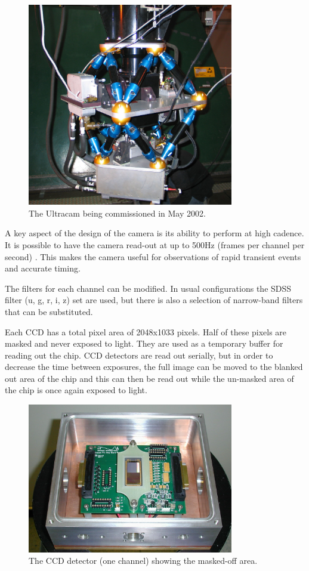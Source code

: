 \documentclass[a4paper,10pt]{article}
\begin{document}
\begin{figure}[!h]
\centering
\includegraphics[width=90mm]{images/IMG_0121_scaled.JPG}
\caption{The Ultracam being commissioned in May 2002.}
\label{fig1}
\end{figure}


A key aspect of the design of the camera is its ability to perform at high cadence. It is possible to have the camera read-out at up to 500Hz (frames per channel per second) \cite{dhillon07}. This makes the camera useful for observations of rapid transient events and accurate timing. 

The filters for each channel can be modified. In usual configurations the SDSS filter (u, g, r, i, z) set are used, but there is also a selection of narrow-band filters that can be substituted.  

Each CCD has a total pixel area of 2048x1033 pixels. Half of these pixels are masked and never exposed to light. They are used as a temporary buffer for reading out the chip. CCD detectors are read out serially, but in order to decrease the time between exposures, the full image can be moved to the blanked out area of the chip and this can then be read out while the un-masked area of the chip is once again exposed to light. 

\begin{figure}[!h]
\centering
\includegraphics[width=90mm]{images/ccd.png}
\caption{The CCD detector (one channel) showing the masked-off area.}
\label{fig2}
\end{figure}
\end{document}
